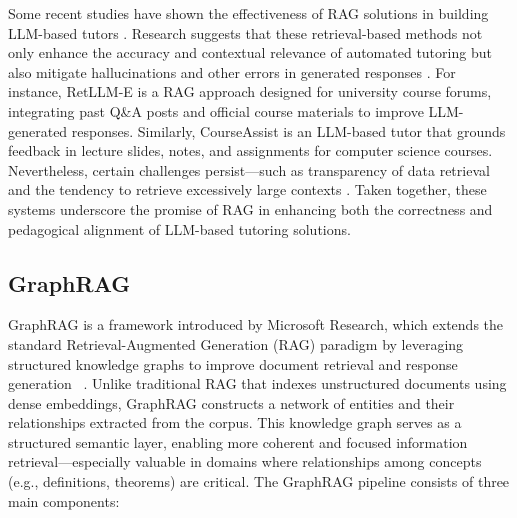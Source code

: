 \documentclass[runningheads]{llncs}
\begin{document}
Some recent studies have shown the effectiveness of RAG solutions in building LLM-based tutors \cite{han2024improving,mitra2024retllme,feng2024courseassistpedagogicallyappropriateai,henkel2024mathrag,salminen2024cipherbot,lng2025rchat}. Research suggests that these retrieval-based methods not only enhance the accuracy and contextual relevance of automated tutoring but also mitigate hallucinations and other errors in generated responses \cite{han2024improving,zheng2024k12rag}. For instance, RetLLM-E \cite{mitra2024retllme} is a RAG approach designed for university course forums, integrating past Q\&A posts and official course materials to improve LLM-generated responses. Similarly, CourseAssist \cite{feng2024courseassistpedagogicallyappropriateai} is an LLM-based tutor that grounds feedback in lecture slides, notes, and assignments for computer science courses.
Nevertheless, certain challenges persist—such as transparency of data retrieval \cite{zheng2024k12rag} and the tendency to retrieve excessively large contexts \cite{lng2025rchat}. Taken together, these systems underscore the promise of RAG in enhancing both the correctness and pedagogical alignment of LLM-based tutoring solutions.


\subsection{GraphRAG}

GraphRAG \cite{edge2024localglobalgraphrag} is a framework introduced by Microsoft Research, which extends the standard Retrieval-Augmented Generation (RAG) paradigm by leveraging structured knowledge graphs to improve document retrieval and response generation ~\cite{chen2020review}. Unlike traditional RAG that indexes unstructured documents using dense embeddings, GraphRAG constructs a network of entities and their relationships extracted from the corpus. This knowledge graph serves as a structured semantic layer, enabling more coherent and focused information retrieval—especially valuable in domains where relationships among concepts (e.g., definitions, theorems) are critical.
The GraphRAG pipeline consists of three main components:
\end{document}
